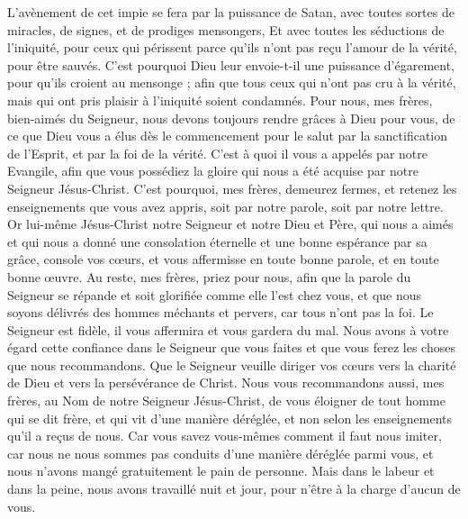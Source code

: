 \begin{multicols}{2}
L'avènement de cet impie se fera par la puissance de Satan, avec toutes sortes de miracles, de signes, et de prodiges mensongers,
Et avec toutes les séductions de l’iniquité, pour ceux qui périssent parce qu'ils n'ont pas reçu l'amour de la vérité, pour être sauvés.
C'est pourquoi Dieu leur envoie-t-il une puissance d’égarement, pour qu’ils croient au mensonge ;
afin que tous ceux qui n’ont pas cru à la vérité, mais qui ont pris plaisir à l’iniquité soient condamnés.
Pour nous, mes frères, bien-aimés du Seigneur, nous devons toujours rendre grâces à Dieu pour vous, de ce que Dieu vous a élus dès le commencement pour le salut par la sanctification de l'Esprit, et par la foi de la vérité.
C’est à quoi il vous a appelés par notre Evangile, afin que vous possédiez la gloire qui nous a été acquise par notre Seigneur Jésus-Christ.
C'est pourquoi, mes frères, demeurez fermes, et retenez les enseignements que vous avez appris, soit par notre parole, soit par notre lettre.
Or lui-même Jésus-Christ notre Seigneur et notre Dieu et Père, qui nous a aimés et qui nous a donné une consolation éternelle et une bonne espérance par sa grâce,
console vos cœurs, et vous affermisse en toute bonne parole, et en toute bonne œuvre.
\VerseOne{}Au reste, mes frères, priez pour nous, afin que la parole du Seigneur se répande et soit glorifiée comme elle l'est chez vous,
et que nous soyons délivrés des hommes méchants et pervers, car tous n’ont pas la foi.
Le Seigneur est fidèle, il vous affermira et vous gardera du mal.
Nous avons à votre égard cette confiance dans le Seigneur que vous faites et que vous ferez les choses que nous recommandons.
Que le Seigneur veuille diriger vos cœurs vers la charité de Dieu et vers la persévérance de Christ.
Nous vous recommandons aussi, mes frères, au Nom de notre Seigneur Jésus-Christ, de vous éloigner de tout homme qui se dit frère, et qui vit d’une manière déréglée, et non selon les enseignements qu'il a reçus de nous.
Car vous savez vous-mêmes comment il faut nous imiter, car nous ne nous sommes pas conduits d’une manière déréglée parmi vous,
et nous n'avons mangé gratuitement le pain de personne. Mais dans le labeur et dans la peine, nous avons travaillé nuit et jour, pour n’être à la charge d’aucun de vous.

\end{multicols}
